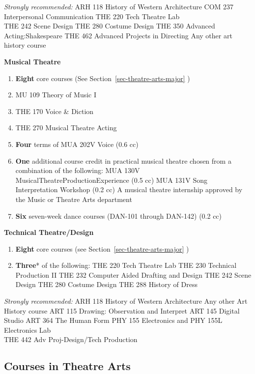 \documentclass[
  letterpaper,
]{scrbook}
\begin{document}
\emph{Strongly recommended:} ARH 118 History of Western Architecture COM
237 Interpersonal Communication THE 220 Tech Theatre Lab\\
THE 242 Scene Design THE 280 Costume Design THE 350 Advanced
Acting:Shakespeare THE 462 Advanced Projects in Directing Any other art
history course

\textbf{Musical Theatre}

\begin{enumerate}
\def\labelenumi{\arabic{enumi}.}
\item
  \textbf{Eight} core courses (See Section~\ref{sec-theatre-arts-major}
  )
\item
  MU 109 Theory of Music I
\item
  THE 170 Voice \& Diction
\item
  THE 270 Musical Theatre Acting
\item
  \textbf{Four} terms of MUA 202V Voice (0.6 cc)
\item
  \textbf{One} additional course credit in practical musical theatre
  chosen from a combination of the following: MUA 130V
  MusicalTheatreProductionExperience (0.5 cc) MUA 131V Song
  Interpretation Workshop (0.2 cc) A musical theatre internship approved
  by the Music or Theatre Arts department
\item
  \textbf{Six} seven-week dance courses (DAN-101 through DAN-142) (0.2
  cc)
\end{enumerate}

\textbf{Technical Theatre/Design}

\begin{enumerate}
\def\labelenumi{\arabic{enumi}.}
\item
  \textbf{Eight} core courses (see Section~\ref{sec-theatre-arts-major}
  )
\item
  \textbf{Three}* of the following: THE 220 Tech Theatre Lab THE 230
  Technical Production II THE 232 Computer Aided Drafting and Design THE
  242 Scene Design THE 280 Costume Design THE 288 History of Dress
\end{enumerate}

\emph{Strongly recommended:} ARH 118 History of Western Architecture Any
other Art History course ART 115 Drawing: Observation and Interpret ART
145 Digital Studio ART 364 The Human Form PHY 155 Electronics and PHY
155L Electronics Lab\\
THE 442 Adv Proj-Design/Tech Production

\hypertarget{courses-in-theatre-arts}{%
\subsection{Courses in Theatre Arts}\label{courses-in-theatre-arts}}
\end{document}
